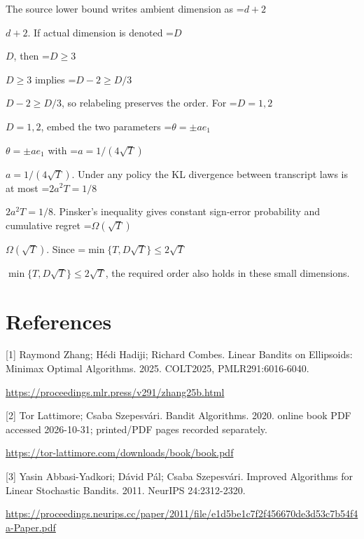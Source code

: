 \documentclass[10pt,a4paper]{article}
\newcommand{\AtlasMath}[1]{\par\begingroup\centering\setbox0=\hbox{$\displaystyle #1$}\ifdim\wd0>1.4\linewidth\typeout{ATLAS WIDE FORMULA: \the\wd0}\fi\ifdim\wd0>\linewidth\resizebox{\linewidth}{!}{\box0}\else\box0\fi\par\endgroup}
\newcommand{\AtlasInlineMath}[1]{\begingroup\setbox0=\hbox{$#1$}\ifdim\wd0>.4\linewidth\endgroup\AtlasMath{#1}\else\endgroup$#1$\fi}
\begin{document}
The source lower bound writes ambient dimension as \AtlasInlineMath{d+2}. If actual dimension is denoted \AtlasInlineMath{D}, then \AtlasInlineMath{D\ge3} implies \AtlasInlineMath{D-2\ge D/3}, so relabeling preserves the order. For \AtlasInlineMath{D=1,2}, embed the two parameters \AtlasInlineMath{\theta=\pm ae_1} with \AtlasInlineMath{a=1/(4\sqrt T)}. Under any policy the KL divergence between transcript laws is at most \AtlasInlineMath{2a^2T=1/8}. Pinsker's inequality gives constant sign-error probability and cumulative regret \AtlasInlineMath{\Omega(\sqrt T)}. Since \AtlasInlineMath{\min\{T,D\sqrt T\}\le2\sqrt T}, the required order also holds in these small dimensions.

\section{References}
[1] Raymond Zhang; Hédi Hadiji; Richard Combes. Linear Bandits on Ellipsoids: Minimax Optimal Algorithms. 2025. COLT2025, PMLR291:6016-6040.

\url{https://proceedings.mlr.press/v291/zhang25b.html}

[2] Tor Lattimore; Csaba Szepesvári. Bandit Algorithms. 2020. online book PDF accessed 2026-10-31; printed/PDF pages recorded separately.

\url{https://tor-lattimore.com/downloads/book/book.pdf}

[3] Yasin Abbasi-Yadkori; Dávid Pál; Csaba Szepesvári. Improved Algorithms for Linear Stochastic Bandits. 2011. NeurIPS 24:2312-2320.

\url{https://proceedings.neurips.cc/paper/2011/file/e1d5be1c7f2f456670de3d53c7b54f4a-Paper.pdf}
\end{document}
